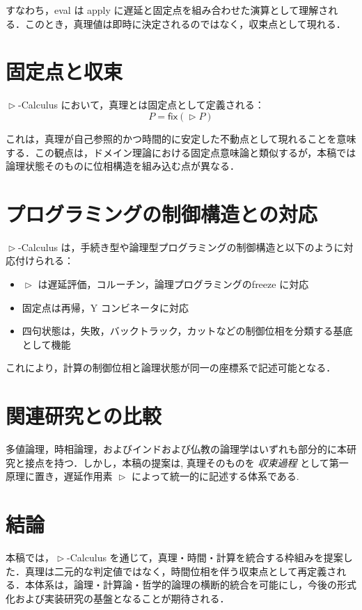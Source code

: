 \documentclass[uplatex,12pt,a4paper]{jsarticle}
\newcommand{\delay}{\mathrel{\triangleright}}
\begin{document}
すなわち，eval は apply に遅延と固定点を組み合わせた演算として理解される．このとき，真理値は即時に決定されるのではなく，収束点として現れる．

\section{固定点と収束}
$\delay$-Calculus において，真理とは固定点として定義される：
\begin{equation}
P = \mathsf{fix}(\delay P)
\end{equation}

これは，真理が自己参照的かつ時間的に安定した不動点として現れることを意味する．この観点は，ドメイン理論における固定点意味論と類似するが，本稿では論理状態そのものに位相構造を組み込む点が異なる．

\section{プログラミングの制御構造との対応}
$\delay$-Calculus は，手続き型や論理型プログラミングの制御構造と以下のように対応付けられる：
\begin{itemize}
\item $\delay$ は遅延評価，コルーチン，論理プログラミングのfreeze に対応
\item 固定点は再帰，Y コンビネータに対応
\item 四句状態は，失敗，バックトラック，カットなどの制御位相を分類する基底として機能
\end{itemize}

これにより，計算の制御位相と論理状態が同一の座標系で記述可能となる．

\section{関連研究との比較}
多値論理，時相論理，およびインドおよび仏教の論理学はいずれも部分的に本研究と接点を持つ．しかし，本稿の提案は, 真理そのものを \emph{収束過程} として第一原理に置き，遅延作用素 $\delay$ によって統一的に記述する体系である.

\section{結論}
本稿では，$\delay$-Calculus を通じて，真理・時間・計算を統合する枠組みを提案した．真理は二元的な判定値ではなく，時間位相を伴う収束点として再定義される．本体系は，論理・計算論・哲学的論理の横断的統合を可能にし，今後の形式化および実装研究の基盤となることが期待される．
\end{document}
